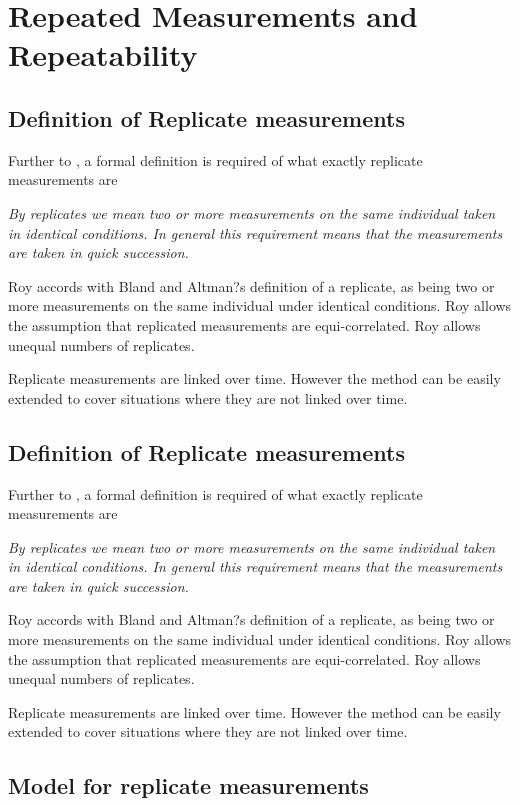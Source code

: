 \documentclass[12pt, a4paper]{report}
\theoremstyle{plain}
\theoremstyle{definition}
\theoremstyle{remark}
\begin{document}
\chapter{Repeated Measurements and Repeatability}
	
	
	
	\section{Definition of Replicate measurements}
	Further to \citet{BA99}, a formal definition is required of what exactly replicate measurements are
	
	\emph{By replicates we mean two or more measurements on the same
		individual taken in identical conditions. In general this requirement means that the
		measurements are taken in quick succession.}
	
	Roy accords with Bland and Altman?s definition of a replicate, as being two or more measurements on the same individual under identical conditions. Roy allows the assumption that replicated measurements are equi-correlated. Roy allows unequal numbers of replicates.
	
	Replicate measurements are linked over time. However the method can be easily extended to cover situations where they are not linked over time.
	\section{Definition of Replicate measurements}
	Further to \citet{BA99}, a formal definition is required of what exactly replicate measurements are
	
	\emph{By replicates we mean two or more measurements on the same
		individual taken in identical conditions. In general this requirement means that the
		measurements are taken in quick succession.}
	
	Roy accords with Bland and Altman?s definition of a replicate, as being two or more measurements on the same individual under identical conditions. Roy allows the assumption that replicated measurements are equi-correlated. Roy allows unequal numbers of replicates.
	
	Replicate measurements are linked over time. However the method can be easily extended to cover situations where they are not linked over time.
	\section{Model for replicate measurements}
	
\end{document}
